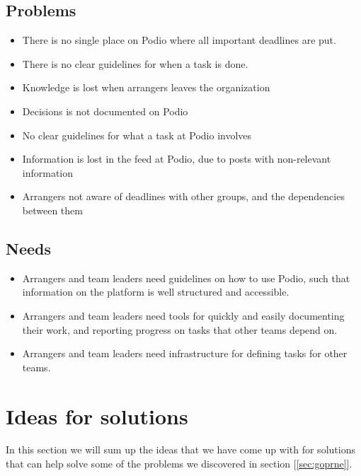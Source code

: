 \subsection{Problems}
\label{subsec:problems}
\begin{itemize}
    \item There is no single place on Podio where all important deadlines are put.
    \item There is no clear guidelines for when a task is done.
	 \item Knowledge is lost when arrangers leaves the organization
	 \item Decisions is not documented on Podio
	 \item No clear guidelines for what a task at Podio involves
	 \item Information is lost in the feed at Podio, due to posts with non-relevant information
	 \item Arrangers not aware of deadlines with other groups, and the dependencies between them
	 
\end{itemize}

\subsection{Needs}
\label{subsec:needs}
\begin{itemize}
    \item Arrangers and team leaders need guidelines on how to use Podio, such that information on the platform is well structured and accessible.
    \item Arrangers and team leaders need tools for quickly and easily documenting their work, and reporting progress on tasks that other teams depend on.
    \item Arrangers and team leaders need infrastructure for defining tasks for other teams.
\end{itemize}

\section{Ideas for solutions}
\label{sec:ideas}
In this section we will sum up the ideas that we have come up with for solutions
that can help solve some of the problems we discovered in section [\ref{sec:goprne}].

